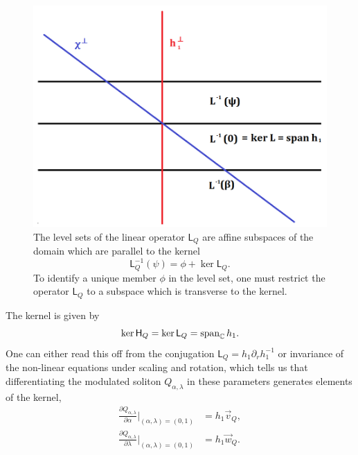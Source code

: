 \begin{figure}[h]\label{fig:orth}
    \begin{center}
        \includegraphics[scale = 0.4]{graphics/inverse}
        \caption{The level sets of the linear operator $\mathsf L_Q$ are affine subspaces of the domain which are parallel to the kernel 
            \[
            \mathsf L_Q^{-1} (\psi) = \phi + \ker \mathsf L_Q.
            \] 
        To identify a unique member $\phi$ in the level set, one must restrict the operator $\mathsf L_Q$ to a subspace which is transverse to the kernel. 
            }
    \end{center}    
\end{figure}

The kernel is given by 
\[
    \ker \mathsf{H}_Q = \ker \mathsf L_Q = \operatorname{span}_\mathbb C h_1.
\]
One can either read this off from the conjugation $\mathsf L_Q = h_1 \partial_r h_1^{-1}$ or invariance of the non-linear equations under scaling and rotation, which tells us that differentiating the modulated soliton $Q_{\alpha, \lambda}$ in these parameters generates elements of the kernel,
\begin{equation}\label{eq:generators}
    \begin{split}
    \frac{\partial Q_{\alpha, \lambda}}{\partial \alpha}\Big|_{(\alpha, \lambda) = (0, 1)}
        &= h_1 \vec v_Q,
        \\
    \frac{\partial Q_{\alpha, \lambda}}{\partial \lambda}\Big|_{(\alpha, \lambda) = (0, 1)} 
        &= h_1 
        \vec w_Q.
    \end{split}
\end{equation}

